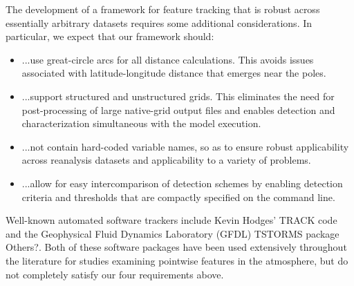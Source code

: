 \documentclass[gmdd, hvmath, online]{copernicus_discussions}
\begin{document}
The development of a framework for feature tracking that is robust across essentially arbitrary datasets requires some additional considerations.  In particular, we expect that our framework should:
\begin{itemize}
\item[] ...use great-circle arcs for all distance calculations.  This avoids issues associated with latitude-longitude distance that emerges near the poles.
\item[] ...support structured and unstructured grids.  This eliminates the need for post-processing of large native-grid output files and enables detection and characterization simultaneous with the model execution.
\item[] ...not contain hard-coded variable names, so as to ensure robust applicability across reanalysis datasets and applicability to a variety of problems.
\item[] ...allow for easy intercomparison of detection schemes by enabling detection criteria and thresholds that are compactly specified on the command line.
\end{itemize}  Well-known automated software trackers include Kevin Hodges' TRACK code \citep{hodges2015track} and the Geophysical Fluid Dynamics Laboratory (GFDL) TSTORMS package \citep{TSTORMS} {\color{red}Others?}.  Both of these software packages have been used extensively throughout the literature for studies examining pointwise features in the atmosphere, but do not completely satisfy our four requirements above.
\end{document}
